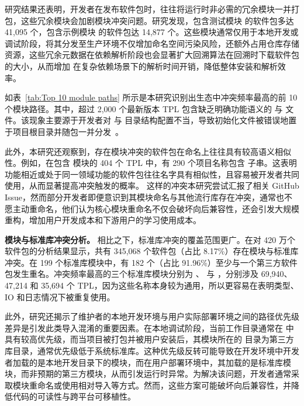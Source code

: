 研究结果还表明，开发者在发布软件包时，往往将运行时非必需的冗余模块一并打包，这些冗余模块会加剧模块冲突问题。研究发现，包含测试模块  的软件包多达 41,095 个，包含示例模块  的软件包达 14,877 个。这些模块通常仅用于本地开发或调试阶段，将其分发至生产环境不仅增加命名空间污染风险，还额外占用仓库存储资源，这些冗余元数据在依赖解析阶段也会显著扩大回溯算法在回溯时下载软件包的大小，从而增加  在复杂依赖场景下的解析时间开销，降低整体安装和解析效率。

如表~\ref{tab:Top 10 module paths} 所示是本研究识别出生态中冲突频率最高的前 10 个模块路径。其中，超过 2,000 个最新版本 TPL 包含缺乏明确功能语义的  与  文件。该现象主要源于开发者对  与  目录结构配置不当，导致初始化文件被错误地置于项目根目录并随包一并分发~\cite{docsertuparg}。

此外，本研究还观察到，存在模块冲突的软件包在命名上往往具有较高语义相似性。例如，在包含  模块的 404 个 TPL 中，有 290 个项目名称包含  子串。这表明功能相近或处于同一领域功能的软件包往往名字具有相似性，且容易被开发者共同使用，从而显著提高冲突触发的概率。
这样的冲突本研究尝试汇报了相关 GitHub Issue，然而部分开发者即便意识到其模块命名与其他流行库存在冲突，通常也不愿主动重命名，他们认为核心模块重命名不仅会破坏向后兼容性，还会引发大规模重构，增加用户开发成本和下游用户的学习使用成本。

\textbf{模块与标准库冲突分析。}
相比之下，标准库冲突的覆盖范围更广。在对 420 万个软件包的分析结果显示，共有 345,068 个软件包（占比 8.17\%）存在模块与标准库冲突。在 199 个标准库模块中，有 182 个（占比 91.96\%）至少与一个第三方软件包发生重名。冲突频率最高的三个标准库模块分别为 、 与 ，分别涉及 69,940、47,214 和 35,694 个 TPL，因为这些名称本身较为通用，所以更容易在表明类型、IO 和日志情况下被重复使用。

此外，研究还揭示了维护者的本地开发环境与用户实际部署环境之间的路径优先级差异是引发此类导入混淆的重要因素。在本地调试阶段，当前工作目录通常在  中具有较高优先级，而当项目被打包并被用户安装后，其模块所在的  目录为第三方库目录，通常优先级低于系统标准库。这种优先级反转可能导致在开发环境中开发者加载的是本地开发目录下的模块，而在用户部署环境中，其加载的是标准库模块，而非预期的第三方模块，从而引发运行时异常。为解决该问题，开发者通常采取模块重命名或使用相对导入等方式。然而，这些方案可能破坏向后兼容性，并降低代码的可读性与跨平台可移植性。

